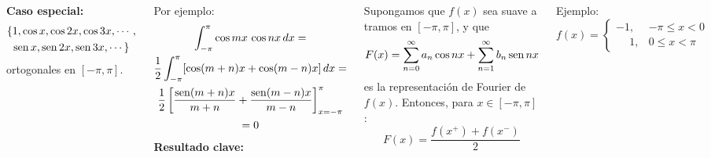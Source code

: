 \documentclass[9pt, aspectratio=169]{beamer}
\begin{document}
\begin{frame}
\begin{columns}[t]
\cx
\textbf{Caso especial:}
\begin{multline*}
\{1, \cos x, \cos 2x, \cos 3x, \cdots, \\
\operatorname{sen} x, \operatorname{sen} 2x, \operatorname{sen} 3x,  \cdots \} 
\end{multline*}
ortogonales en $[-\pi, \pi]$.

Por ejemplo:
\begin{multline*}
\int_{-\pi}^{\pi} \cos mx \, \cos nx \, dx = \\
\frac{1}{2} \int_{-\pi}^{\pi} [\cos(m + n) x + \cos(m - n) x] \, dx = \\
\frac{1}{2} \left[ \frac{\operatorname{sen}(m + n) x}{m + n} + \frac{\operatorname{sen}(m-n) x}{m - n} \right]_{x = -\pi}^{\pi} \\
= 0
\end{multline*}
\cx
\textbf{Resultado clave:}

Supongamos que $f(x)$ sea suave a tramos en $[-\pi, \pi]$, y que
\[ F(x) = \sum_{n = 0}^{\infty} a_n \cos nx + \sum_{n = 1}^{\infty} b_n \operatorname{sen} nx \]
es la representación de Fourier de $f(x)$. Entonces, para $x \in [-\pi, \pi]$:
\[ F(x) = \frac{f(x^+) + f(x^-)}{2} \]

\begin{exampleblock}{Ejemplo:}
    \begin{equation*}
        f(x) = \begin{cases}
            -1, &-\pi \leq x < 0 \\
            \phantom{-}1, &0 \leq x < \pi
        \end{cases}
    \end{equation*}
\end{exampleblock}
\end{columns}
\end{frame}
\end{document}
